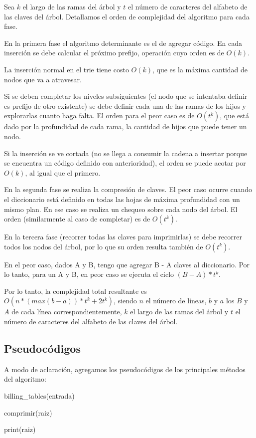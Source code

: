 Sea $k$ el largo de las ramas del árbol y $t$ el número de caracteres del
alfabeto de las claves del árbol. Detallamos el orden de complejidad del
algoritmo para cada fase.

En la primera fase el algoritmo determinante es el de agregar código. En cada
inserción se debe calcular el próximo prefijo, operación cuyo orden es de $O(k)$.

La inserción normal en el trie tiene costo $O(k)$, que es la máxima cantidad
de nodos que va a atravesar.

Si se deben completar los niveles subsiguientes (el nodo que se intentaba
definir es prefijo de otro existente) se debe definir cada una de las ramas
de los hijos y explorarlas cuanto haga falta. El orden para el peor caso es
de $O(t^k)$, que está dado por la profundidad de cada rama, la cantidad
de hijos que puede tener un nodo.

Si la inserción se ve cortada (no se llega a consumir la cadena a insertar
porque se encuentra un código definido con anterioridad), el orden se puede
acotar por $O(k)$, al igual que el primero.

En la segunda fase se realiza la compresión de claves. El peor caso ocurre
cuando el diccionario está definido en todas las hojas de máxima profundidad
con un mismo plan. En ese caso se realiza un chequeo sobre cada nodo del árbol.
El orden (similarmente al caso de completar) es de $O(t^k)$.

En la tercera fase (recorrer todas las claves para imprimirlas) se debe
recorrer todos los nodos del árbol, por lo que su orden resulta también de
$O(t^k)$.

En el peor caso, dados A y B, tengo que agregar B - A claves al diccionario.
Por lo tanto, para un A y B, en peor caso se ejecuta el ciclo $(B-A)*t^k$.

Por lo tanto, la complejidad total resultante es $O(n*(max(b-a))*t^k + 2t^k)$, siendo
$n$ el número de líneas, $b$ y $a$ los $B$ y $A$ de cada línea correspondientemente,
$k$ el largo de las ramas del árbol y $t$ el número de caracteres del
alfabeto de las claves del árbol.

\subsection*{Pseudocódigos}

A modo de aclaración, agregamos los pseudocódigos de los principales métodos del algoritmo:

\begin{algorithm}[H]
\linesnumbered
\caption{billing\_tables(entrada)}
\vspace{0.4cm}

comprimir(raiz)

print(raiz)
\end{algorithm}

